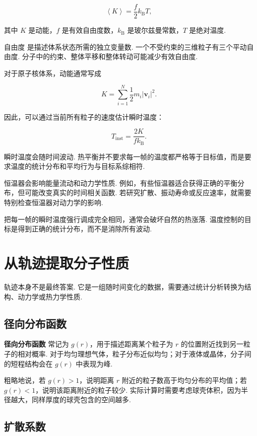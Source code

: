 \documentclass[UTF8,11pt,a4paper,openany]{ctexbook}
\newcommand{\term}[1]{\textbf{#1}}
\begin{document}
\[
\left\langle K\right\rangle
=
\frac{f}{2}k_{\mathrm B}T,
\]

其中 $K$ 是动能，$f$ 是有效自由度数，$k_{\mathrm B}$ 是玻尔兹曼常数，$T$ 是绝对温度. 

\begin{definitionbox}
自由度 是描述体系状态所需的独立变量数. 一个不受约束的三维粒子有三个平动自由度. 分子中的约束、整体平移和整体转动可能减少有效自由度. 
\end{definitionbox}

对于原子核体系，动能通常写成

\[
K
=
\sum_{i=1}^{N}
\frac{1}{2}m_i\left|\mathbf v_i\right|^2.
\]

因此，可以通过当前所有粒子的速度估计瞬时温度：

\[
T_{\mathrm{inst}}
=
\frac{2K}{fk_{\mathrm B}}.
\]

瞬时温度会随时间波动. 热平衡并不要求每一帧的温度都严格等于目标值，而是要求温度的统计分布和平均行为与目标系综相符. 

恒温器会影响能量流动和动力学性质. 例如，有些恒温器适合获得正确的平衡分布，但可能改变真实的时间相关函数. 若研究扩散、振动寿命或反应速率，就需要特别检查恒温器对动力学的影响. 

\begin{limitbox}
把每一帧的瞬时温度强行调成完全相同，通常会破坏自然的热涨落. 温度控制的目标是得到正确的统计分布，而不是消除所有波动. 
\end{limitbox}

\section{从轨迹提取分子性质}

轨迹本身不是最终答案. 它是一组随时间变化的数据，需要通过统计分析转换为结构、动力学或热力学性质. 

\subsection{径向分布函数}

\term{径向分布函数} 常记为 $g(r)$，用于描述距离某个粒子为 $r$ 的位置附近找到另一粒子的相对概率. 对于均匀理想气体，粒子分布近似均匀；对于液体或晶体，分子间的短程结构会在 $g(r)$ 中表现为峰. 

粗略地说，若 $g(r)>1$，说明距离 $r$ 附近的粒子数高于均匀分布的平均值；若 $g(r)<1$，说明该距离附近的粒子较少. 实际计算时需要考虑球壳体积，因为半径越大，同样厚度的球壳包含的空间越多. 

\subsection{扩散系数}
\end{document}
